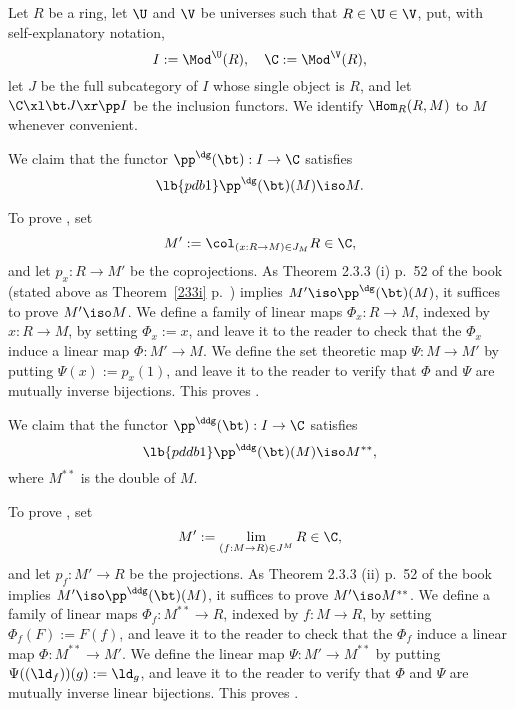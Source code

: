 \documentclass[12pt]{article}
\theoremstyle{remark}
\theoremstyle{definition}
\begin{document}
% 


%


Let $R$ be a ring, let $\U$ and $\V$ be universes such that $R\in\U\in\V$, put, with self-explanatory notation, 
$$
I:=\Mod^\U(R),\quad\C:=\Mod^\V(R),
$$ 
let $J$ be the full subcategory of $I$ whose single object is $R$, and let $\C\xl\bt J\xr\pp I$ be the inclusion functors. We identify $\Hom_R(R,M)$ to $M$ whenever convenient. 

We claim that the functor $\pp^\dg(\bt):I\to\C$ satisfies 
\begin{equation}\lb{pdb1}
\pp^\dg(\bt)(M)\iso M.
\end{equation} 

To prove , set 
$$
M':=\col_{(x:R\to M)\in J_M}R\in\C, 
$$ 
and let $p_x:R\to M'$ be the coprojections. As Theorem 2.3.3 (i) p.~52 of the book (stated above as Theorem~\ref{233i} p.~) implies $M'\iso\pp^\dg(\bt)(M)$, it suffices to prove $M'\iso M$. We define a family of linear maps $\Phi_x:R\to M$, indexed by $x:R\to M$, by setting $\Phi_x:=x$, and leave it to the reader to check that the $\Phi_x$ induce a linear map $\Phi:M'\to M$. We define the set theoretic map $\Psi:M\to M'$ by putting $\Psi(x):=p_x(1)$, and leave it to the reader to verify that $\Phi$ and $\Psi$ are mutually inverse bijections. This proves . 

We claim that the functor $\pp^\ddg(\bt):I\to\C$ satisfies 
\begin{equation}\lb{pddb1}
\pp^\ddg(\bt)(M)\iso M^{**}, 
\end{equation} 
where $M^{**}$ is the double  of $M$. 

To prove , set 
$$
M':=\lim_{(f:M\to R)\in J^M}R\in\C, 
$$ 
and let $p_f:M'\to R$ be the projections. As Theorem 2.3.3 (ii) p.~52 of the book implies $M'\iso\pp^\ddg(\bt)(M)$, it suffices to prove $M'\iso M^{**}$. We define a family of linear maps $\Phi_f:M^{**}\to R$, indexed by $f:M\to R$, by setting $\Phi_f(F):=F(f)$, and leave it to the reader to check that the $\Phi_f$ induce a linear map $\Phi:M^{**}\to M'$. We define the linear map $\Psi:M'\to M^{**}$ by putting $\Psi((\ld_f))(g):=\ld_g$, and leave it to the reader to verify that $\Phi$ and $\Psi$ are mutually inverse linear bijections. This proves . 
\end{document}
